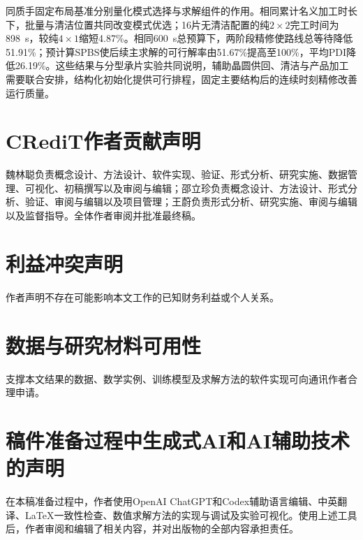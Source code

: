 \documentclass[final,5p,times,twocolumn]{elsarticle}
\begin{document}
同质手固定布局基准分别量化模式选择与求解组件的作用。相同累计名义加工时长下，批量与清洁位置共同改变模式优选；16片无清洁配置的纯$2\times2$完工时间为898~s，较纯$4\times1$缩短4.87\%。相同600~s总预算下，两阶段精修使路线总等待降低51.91\%；预计算SPBS使后续主求解的可行解率由51.67\%提高至100\%，平均PDI降低26.19\%。这些结果与分型承片实验共同说明，辅助晶圆供回、清洁与产品加工需要联合安排，结构化初始化提供可行排程，固定主要结构后的连续时刻精修改善运行质量。

\section*{CRediT作者贡献声明}
魏林聪负责概念设计、方法设计、软件实现、验证、形式分析、研究实施、数据管理、可视化、初稿撰写以及审阅与编辑；邵立珍负责概念设计、方法设计、形式分析、验证、审阅与编辑以及项目管理；王蔚负责形式分析、研究实施、审阅与编辑以及监督指导。全体作者审阅并批准最终稿。

\section*{利益冲突声明}
作者声明不存在可能影响本文工作的已知财务利益或个人关系。

\section*{数据与研究材料可用性}
支撑本文结果的数据、数学实例、训练模型及求解方法的软件实现可向通讯作者合理申请。

\section*{稿件准备过程中生成式AI和AI辅助技术的声明}
在本稿准备过程中，作者使用OpenAI ChatGPT和Codex辅助语言编辑、中英翻译、LaTeX一致性检查、数值求解方法的实现与调试及实验可视化。使用上述工具后，作者审阅和编辑了相关内容，并对出版物的全部内容承担责任。
\end{document}
